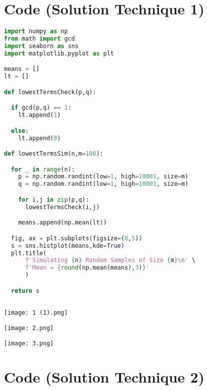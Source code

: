 \documentclass{article}
\begin{document}
\section{Code (Solution Technique 1)}
\begin{lstlisting}[language=Python, caption = Solution technique 1 incorporates a simulation process of many samples for a visual representation of convergence]
import numpy as np
from math import gcd
import seaborn as sns
import matplotlib.pyplot as plt

means = []
lt = []

def lowestTermsCheck(p,q):

  if gcd(p,q) == 1:
    lt.append(1)

  else:
    lt.append(0)

def lowestTermsSim(n,m=100):

  for _ in range(n):
    p = np.random.randint(low=1, high=10001, size=m)
    q = np.random.randint(low=1, high=10001, size=m)

    for i,j in zip(p,q):
      lowestTermsCheck(i,j)

    means.append(np.mean(lt))

  fig, ax = plt.subplots(figsize=(8,5))
  s = sns.histplot(means,kde=True)
  plt.title(
      f'Simulating {n} Random Samples of Size {m}\n' \
      f'Mean = {round(np.mean(means),3)}'
      )

  return s
 
\end{lstlisting}

\pagebreak 
\begin{center}
\texttt{[image: 1 (1).png]}
\end{center}
\begin{center}
\texttt{[image: 2.png]}
\end{center}
\begin{center}
\texttt{[image: 3.png]}
\end{center}


\pagebreak

\section{Code (Solution Technique 2)}
\end{document}
